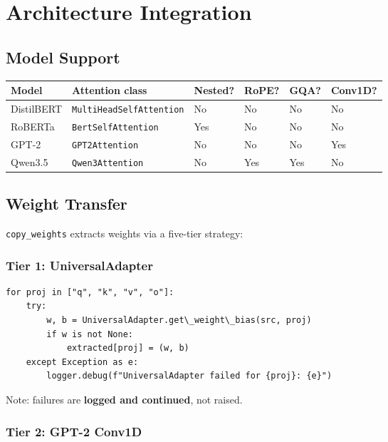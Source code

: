 \section{Architecture Integration}

\subsection{Model Support}

\begin{table}[H]
\centering
\small
\begin{tabular}{llllll}
\toprule
\textbf{Model} & \textbf{Attention class} & \textbf{Nested?} & \textbf{RoPE?} & \textbf{GQA?} & \textbf{Conv1D?} \\
\midrule
DistilBERT & \texttt{MultiHeadSelfAttention} & No & No & No & No \\
RoBERTa & \texttt{BertSelfAttention} & Yes & No & No & No \\
GPT-2 & \texttt{GPT2Attention} & No & No & No & Yes \\
Qwen3.5 & \texttt{Qwen3Attention} & No & Yes & Yes & No \\
\bottomrule
\end{tabular}
\end{table}

\subsection{Weight Transfer}

\texttt{copy\_weights} extracts weights via a five-tier strategy:

\subsubsection{Tier 1: UniversalAdapter}

\begin{lstlisting}
for proj in ["q", "k", "v", "o"]:
    try:
        w, b = UniversalAdapter.get\_weight\_bias(src, proj)
        if w is not None:
            extracted[proj] = (w, b)
    except Exception as e:
        logger.debug(f"UniversalAdapter failed for {proj}: {e}")
\end{lstlisting}

Note: failures are \textbf{logged and continued}, not raised.

\subsubsection{Tier 2: GPT-2 Conv1D}

